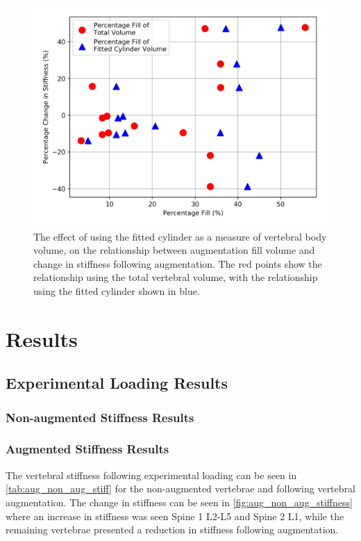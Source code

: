 \begin{figure}[ht!]
  \centering
  \includegraphics[width=.7\textwidth]{Chapters/Chapter_HT_images/cyl_fit_comparison.png}
  \caption{The effect of using the fitted cylinder as a measure of vertebral body volume, on the relationship between augmentation fill volume and change in stiffness following augmentation. The red points show the relationship using the total vertebral volume, with the relationship using the fitted cylinder shown in blue.}
  \label{fig:cyl_fit_comparison}
\end{figure}











\section{Results}


\subsection{Experimental Loading Results}

\subsubsection{Non-augmented Stiffness Results}

\subsubsection{Augmented Stiffness Results}\label{sec:aug_stiffness_res}

The vertebral stiffness following experimental loading can be seen in \cref{tab:aug_non_aug_stiff} for the non-augmented vertebrae and following vertebral augmentation.
The change in stiffness can be seen in \cref{fig:aug_non_aug_stiffness} where an increase in stiffness was seen Spine 1 L2-L5 and Spine 2 L1, while the remaining vertebrae presented a reduction in stiffness following augmentation.

